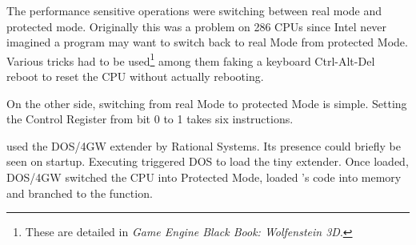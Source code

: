 The performance sensitive operations were switching between real mode and protected mode. Originally this was a problem on 286 CPUs since Intel never imagined a program may want to switch back to real Mode from protected Mode. Various tricks had to be used\footnote{These are detailed in \textit{Game Engine Black Book: Wolfenstein 3D}.} among them faking a keyboard Ctrl-Alt-Del reboot to reset the CPU without actually rebooting.\\
\par
On the other side, switching from real Mode to protected Mode is simple. Setting the Control Register from bit 0 to 1 takes six instructions.\\
\par
{}
\par

\doom{} used the DOS/4GW extender by Rational Systems. Its presence could briefly be seen on startup. Executing  triggered DOS to load the tiny extender. Once loaded, DOS/4GW switched the CPU into Protected Mode, loaded \doom's code into memory and branched to the  function.\\
\par
{}





